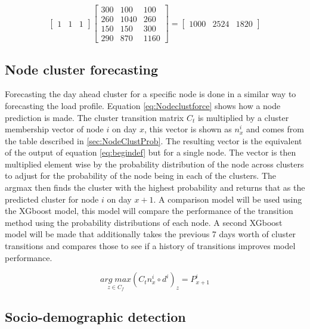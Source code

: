 \begin{equation}
\begin{bmatrix}
 1& 1 & 1   
\end{bmatrix}
\begin{bmatrix}
300 & 100 &100 \\ 
260 &1040  & 260\\ 
150 & 150 &300 \\ 
 290& 870 & 1160
\end{bmatrix}
=
\begin{bmatrix}
1000 & 2524 &  1820 
\end{bmatrix}
\label{eq:endeaxmple}
\end{equation}



\subsection{Node cluster forecasting}

Forecasting the day ahead cluster for a specific node is done in a similar way to forecasting the load profile. Equation \ref{eq:Nodeclustforce} shows how a node prediction is made. The cluster transition matrix $C_t$ is multiplied by a cluster membership vector of node $i$ on day $x$, this vector is shown as $n^{i}_{x}$ and comes from the table described in \ref{sec:NodeClustProb}. The resulting vector is the equivalent of the output of equation \ref{eq:begindef} but for a single node. The vector is then multiplied element wise by the probability distribution of the node across clusters to adjust for the probability of the node being in each of the clusters. The argmax then finds the cluster with the highest probability and returns that as the predicted cluster for node $i$ on day $x+1$. A comparison model will be used using the XGboost model, this model will compare the performance of the transition method using the probability distributions of each node. A second XGboost model will be made that additionally takes the previous 7 days worth of cluster transitions and compares those to see if a history of transitions improves model performance.


\begin{equation}
    \underset{z\in C_f}{arg \; max}(C_t n^{i}_{x} \circ d^i)_z=P^{i}_{x+1}
\label{eq:Nodeclustforce}
\end{equation}


\subsection{Socio-demographic detection}

